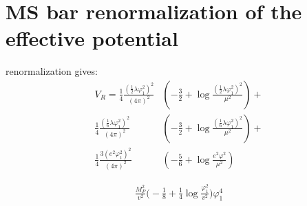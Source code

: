 \chapter{MS bar renormalization of the effective potential}



\MSbar renormalization gives:
\begin{align}
V_R=\frac{1}{4}\frac{(\frac{1}{2}\lambda\varphi_1^2)^2}{(4\pi)^2}&\left(-\frac{3}{2}+ 
\log{\frac{(\frac{1}{2}\lambda\varphi_1^2)^2}{\mu^2}}\right) + \\
\frac{1}{4}\frac{(\frac{1}{6}\lambda\varphi_1^2)^2}{(4\pi)^2}&\left(-\frac{3}{2}+ 
\log{\frac{(\frac{1}{6}\lambda\varphi_1^2)^2}{\mu^2}}\right) + \\
\frac{1}{4}\frac{3(e^2\varphi_1^2)^2}{(4\pi)^2}&\left(-\frac{5}{6}+
\log{\frac{e^2\varphi^2}{\mu^2}}\right)
\end{align}

\begin{align}
\frac{M_P^2}{v^2}\Big(-\frac{1}{8}+\frac{1}{4}\log\frac{\varphi_1^2}{v^2}\Big)\varphi_1^4
\end{align}
